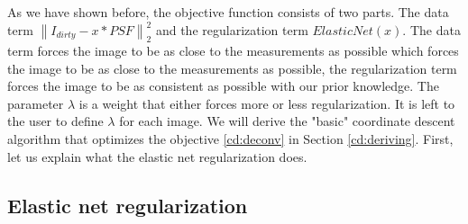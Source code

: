 As we have shown before, the objective function consists of two parts. The data term $\left \| I_{dirty} - x * PSF \right \|_2^2$ and the regularization term $ElasticNet(x)$. The data term forces the image to be as close to the measurements as possible which forces the image to be as close to the measurements as possible, the regularization term forces the image to be as consistent as possible with our prior knowledge. The parameter $\lambda$ is a weight that either forces more or less regularization. It is left to the user to define $\lambda$ for each image. We will derive the "basic" coordinate descent algorithm that optimizes the objective \eqref{cd:deconv} in Section \ref{cd:deriving}. First, let us explain what the elastic net regularization does.

\subsection{Elastic net regularization} \label{cd:reg}
